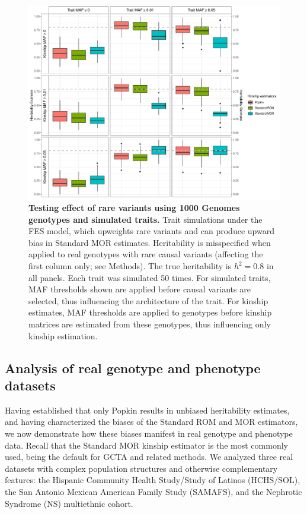 \documentclass[11pt]{article}
\begin{document}
\begin{figure}[bp!]
  \centering
  \includegraphics[width=\textwidth]{data/tgp_sim_fes.pdf}
  \caption{
    {\bf Testing effect of rare variants using 1000 Genomes genotypes and simulated traits.}
    Trait simulations under the FES model, which upweights rare variants and can produce upward bias in Standard MOR estimates. Heritability is misspecified when applied to real genotypes with rare causal variants (affecting the first column only; see Methods). 
    The true heritability is $h^2 = 0.8$ in all panels. Each trait was simulated 50 times. 
    For simulated traits, MAF thresholds shown are applied before causal variants are selected, thus influencing the architecture of the trait.
    For kinship estimates, MAF thresholds are applied to genotypes before kinship matrices are estimated from these genotypes, thus influencing only kinship estimation.
    }
  \label{fig:tgp_sim_fes}
\end{figure}


\subsection{Analysis of real genotype and phenotype datasets}

Having established that only Popkin results in unbiased heritability estimates, and having characterized the biases of the Standard ROM and MOR estimators, we now demonstrate how these biases manifest in real genotype and phenotype data.  Recall that the Standard MOR kinship estimator is the most commonly used, being the default for GCTA and related methods. We analyzed three real datasets with complex population structures and otherwise complementary features: the Hispanic Community Health Study/Study of Latinos (HCHS/SOL), the San Antonio Mexican American Family Study (SAMAFS), and the Nephrotic Syndrome (NS) multiethnic cohort.
\end{document}
